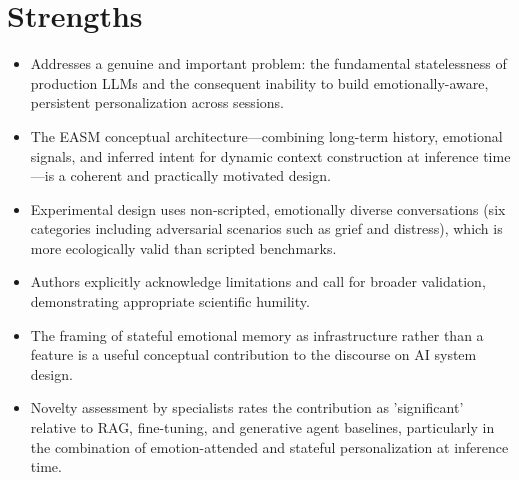 \documentclass[11pt]{article}
\begin{document}
\section*{Strengths}
\begin{itemize}[leftmargin=*]
  \item Addresses a genuine and important problem: the fundamental statelessness of production LLMs and the consequent inability to build emotionally-aware, persistent personalization across sessions.
  \item The EASM conceptual architecture—combining long-term history, emotional signals, and inferred intent for dynamic context construction at inference time—is a coherent and practically motivated design.
  \item Experimental design uses non-scripted, emotionally diverse conversations (six categories including adversarial scenarios such as grief and distress), which is more ecologically valid than scripted benchmarks.
  \item Authors explicitly acknowledge limitations and call for broader validation, demonstrating appropriate scientific humility.
  \item The framing of stateful emotional memory as infrastructure rather than a feature is a useful conceptual contribution to the discourse on AI system design.
  \item Novelty assessment by specialists rates the contribution as 'significant' relative to RAG, fine-tuning, and generative agent baselines, particularly in the combination of emotion-attended and stateful personalization at inference time.
\end{itemize}
\end{document}
